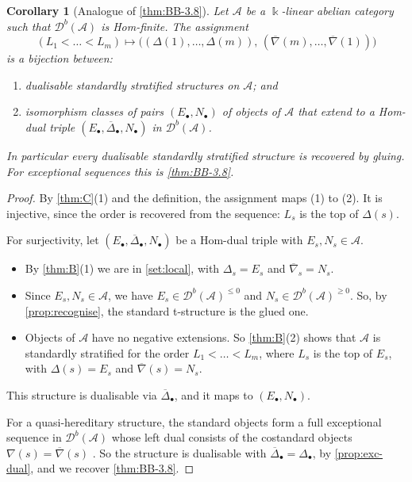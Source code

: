 \documentclass[11pt,reqno]{amsart}
\theoremstyle{plain}
\newtheorem{corollary}[theorem]{Corollary}
\theoremstyle{definition}
\theoremstyle{remark}
\newcommand{\kk}{\Bbbk}
\newcommand{\Db}{\mathcal{D}^b}
\newcommand{\nablabar}{\overline{\nabla}}
\newcommand{\Deltabar}{\overline{\Delta}}
\newcommand{\cA}{\mathcal{A}}
\begin{document}
\begin{corollary}[Analogue of {\cref{thm:BB-3.8}}]\label{cor:BB38}
Let $\cA$ be a $\kk$-linear abelian category such that $\Db(\cA)$ is Hom-finite. The assignment
\[(L_1<\dots<L_m)\longmapsto\big((\Delta(1),\dots,\Delta(m)),\,(\nablabar(m),\dots,\nablabar(1))\big)\]
is a bijection between:
\begin{enumerate}
\item dualisable standardly stratified structures on $\cA$; and
\item isomorphism classes of pairs $(E_\bullet,N_\bullet)$ of objects of $\cA$ that extend to a Hom-dual triple $(E_\bullet,\Deltabar_\bullet,N_\bullet)$ in $\Db(\cA)$.
\end{enumerate}
In particular every dualisable standardly stratified structure is recovered by gluing. For exceptional sequences this is \cref{thm:BB-3.8}.
\end{corollary}

\begin{proof}
By \cref{thm:C}(1) and the definition, the assignment maps (1) to (2). It is injective, since the order is recovered from the sequence: $L_s$ is the top of $\Delta(s)$.

For surjectivity, let $(E_\bullet,\Deltabar_\bullet,N_\bullet)$ be a Hom-dual triple with $E_s,N_s\in\cA$.
\begin{itemize}
\item By \cref{thm:B}(1) we are in \cref{set:local}, with $\Delta_s=E_s$ and $\nablabar_s=N_s$.
\item Since $E_s,N_s\in\cA$, we have $E_s\in\Db(\cA)^{\le0}$ and $N_s\in\Db(\cA)^{\ge0}$. So, by \cref{prop:recognise}, the standard t-structure is the glued one.
\item Objects of $\cA$ have no negative extensions. So \cref{thm:B}(2) shows that $\cA$ is standardly stratified for the order $L_1<\dots<L_m$, where $L_s$ is the top of $E_s$, with $\Delta(s)=E_s$ and $\nablabar(s)=N_s$.
\end{itemize}
This structure is dualisable via $\Deltabar_\bullet$, and it maps to $(E_\bullet,N_\bullet)$.

For a quasi-hereditary structure, the standard objects form a full exceptional sequence in $\Db(\cA)$ whose left dual consists of the costandard objects $\nabla(s)=\nablabar(s)$ \cite[\S3]{BB26}. So the structure is dualisable with $\Deltabar_\bullet=\Delta_\bullet$, by \cref{prop:exc-dual}, and we recover \cref{thm:BB-3.8}.
\end{proof}
\end{document}
